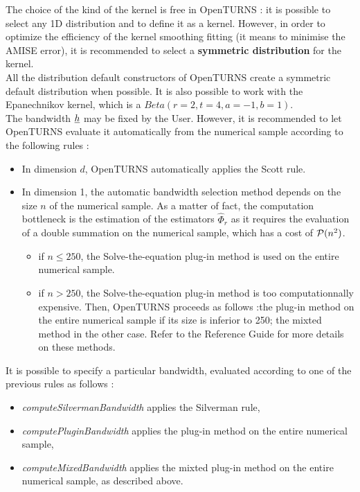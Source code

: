 The choice of the kind of the kernel is free in OpenTURNS : it is possible to select any 1D distribution and to define it as a kernel. However, in order to optimize the efficiency of the kernel smoothing fitting (it means to minimise the AMISE error), it is recommended to select a {\bf symmetric distribution} for the kernel. \\
All the distribution default constructors of OpenTURNS create a symmetric default distribution when possible. It is also possible to work with the Epanechnikov kernel, which is a $Beta(r=2, t=4, a=-1, b=1)$. \\

The bandwidth ${\underline{h}}$ may be fixed by the User. However, it is recommended to let OpenTURNS evaluate it automatically from the numerical sample according to the following rules :
\begin{itemize}
\item In dimension $d$, OpenTURNS automatically applies the Scott rule.
\item In dimension 1, the automatic bandwidth selection method depends  on the size $n$ of the numerical sample. As a matter of fact, the computation bottleneck is the estimation of the estimators $\hat{\Phi}_r$ as it requires the evaluation of a double summation on the numerical sample, which has a cost of ${\mathcal P}(n^2)$.
  \begin{itemize}
  \item if $n \leq 250$, the Solve-the-equation  plug-in method is used on the entire numerical sample.
  \item if $n>250$, the Solve-the-equation  plug-in method is too computationnally expensive. Then, OpenTURNS proceeds as follows :the plug-in method on the entire numerical sample if its size is inferior to 250; the mixted method in the other case. Refer to the Reference Guide for more details on these methods.
  \end{itemize}
\end{itemize}


It is possible to specify a particular bandwidth, evaluated according to one of the previous rules as follows :
\begin{itemize}
\item \emph{computeSilvermanBandwidth} applies the Silverman rule,
\item \emph{computePluginBandwidth} applies the plug-in method on the entire numerical sample,
\item \emph{computeMixedBandwidth} applies the mixted plug-in method on the entire numerical sample, as described above.
\end{itemize}

